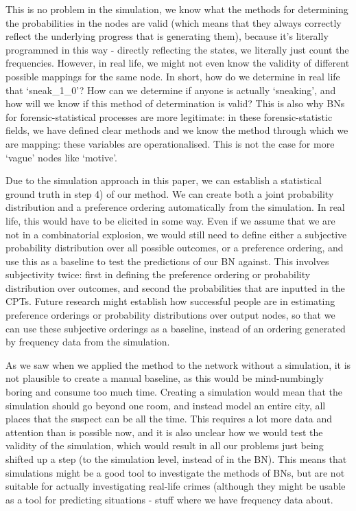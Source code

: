 \documentclass[12pt]{article}
\begin{document}
This is no problem in the simulation, we know what the methods for determining the probabilities in the nodes are valid (which means that they always correctly reflect the underlying progress that is generating them), because it's literally programmed in this way - directly reflecting the states, we literally just count the frequencies. However, in real life, we might not even know the validity of different possible mappings for the same node. In short, how do we determine in real life that `sneak\_1\_0'? How can we determine if anyone is actually `sneaking', and how will we know if this method of determination is valid? This is also why BNs for forensic-statistical processes are more legitimate: in these forensic-statistic fields, we have defined clear methods and we know the method through which we are mapping: these variables are operationalised. This is not the case for more `vague' nodes like `motive'.

 Due to the simulation approach in this paper, we can establish a statistical ground truth in step 4) of our method. We can create both a joint probability distribution and a preference ordering automatically from the simulation. In real life, this would have to be elicited in some way. Even if we assume that we are not in a combinatorial explosion, we would still need to define either a subjective probability distribution over all possible outcomes, or a preference ordering, and use this as a baseline to test the predictions of our BN against. This involves subjectivity twice: first in defining the preference ordering or probability distribution over outcomes, and second the probabilities that are inputted in the CPTs. Future research might establish how successful people are in estimating preference orderings or probability distributions over output nodes, so that we can use these subjective orderings as a baseline, instead of an ordering generated by frequency data from the simulation.

As we saw when we applied the method to the network without a simulation, it is not plausible to create a manual baseline, as this would be mind-numbingly boring and consume too much time.  Creating a simulation would mean that the simulation should go beyond one room, and instead model an entire city, all places that the suspect can be all the time. This requires a lot more data and attention than is possible now, and it is also unclear how we would test the validity of the simulation, which would result in all our problems just being shifted up a step (to the simulation level, instead of in the BN). This means that simulations might be a good tool to investigate the methods of BNs, but are not suitable for actually investigating real-life crimes (although they might be usable as a tool for predicting situations - stuff where we have frequency data about.
\end{document}
